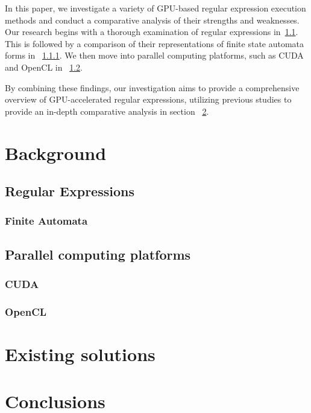 \documentclass[10pt,onecolumn,twoside,english,a4paper]{article}
\begin{document}
In this paper, we investigate a variety of GPU-based regular expression execution methods and conduct a comparative analysis of their strengths and weaknesses. Our research begins with a thorough examination of regular expressions in~\ref{Regular Expressions}. This is followed by a comparison of their representations of finite state automata forms in ~\ref{Finite Automata}. We then move into parallel computing platforms, such as CUDA and OpenCL in ~\ref{Parallel computing platforms}.

By combining these findings, our investigation aims to provide a comprehensive overview of GPU-accelerated regular expressions, utilizing previous studies to provide an in-depth comparative analysis in section ~\ref{Existing solutions}.

\section{Background} \label{Background}

\subsection{Regular Expressions} \label{Regular Expressions}

\subsubsection{Finite Automata} \label{Finite Automata}

\subsection{Parallel computing platforms} \label{Parallel computing platforms}

\subsubsection{CUDA} \label{Cuda}

\subsubsection{OpenCL} \label{OpenCL}

\section{Existing solutions} \label{Existing solutions}

\section{Conclusions} \label{Conclusions} %



\end{document}
